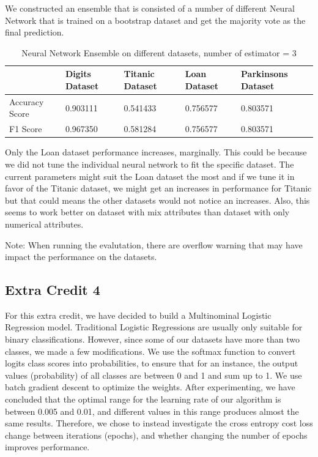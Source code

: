 \documentclass[letterpaper]{article}
\begin{document}
We constructed an ensemble that is consisted of a number of different Neural Network that is trained on a bootstrap dataset and get the majority vote
as the final prediction.

\begin{table}[H]
	\centering
	\begin{tabular}{|l|l|l|l|l|}
		\hline
		               & Digits Dataset & Titanic Dataset & Loan Dataset & Parkinsons Dataset \\ \hline
		Accuracy Score & 0.903111       & 0.541433        & 0.756577     & 0.803571           \\ \hline
		F1 Score       & 0.967350       & 0.581284        & 0.756577     & 0.803571           \\ \hline
	\end{tabular}
	\caption{Neural Network Ensemble on different datasets, number of estimator = 3}
\end{table}

Only the Loan dataset performance increases, marginally. This could be because we did not tune the individual neural network to fit the specific dataset.
The current parameters might suit the Loan dataset the most and if we tune it in favor of the Titanic dataset, we might get an increases in performance
for Titanic but that could means the other datasets would not notice an increases. Also, this seems to work better on dataset with mix attributes than
dataset with only numerical attributes.

Note: When running the evalutation, there are overflow warning that may have impact the performance on the datasets.

\subsection*{Extra Credit 4}

For this extra credit, we have decided to build a Multinominal Logistic Regression model. Traditional Logistic Regressions are usually only suitable for binary classifications.
However, since some of our datasets have more than two classes, we made a few modifications. 
We use the softmax function to convert logits class scores into probabilities, to ensure that for an instance, the output values (probability) of all classes are between 0 and 1 and sum up to 1.
We use batch gradient descent to optimize the weights. After experimenting, we have concluded that the optimal range for the learning rate of our algorithm is between 0.005 and 0.01, and different values in this range produces almost the same results.
 Therefore, we chose to instead investigate the cross entropy cost loss change between iterations (epochs), and whether changing the number of epochs improves performance. 
\end{document}
